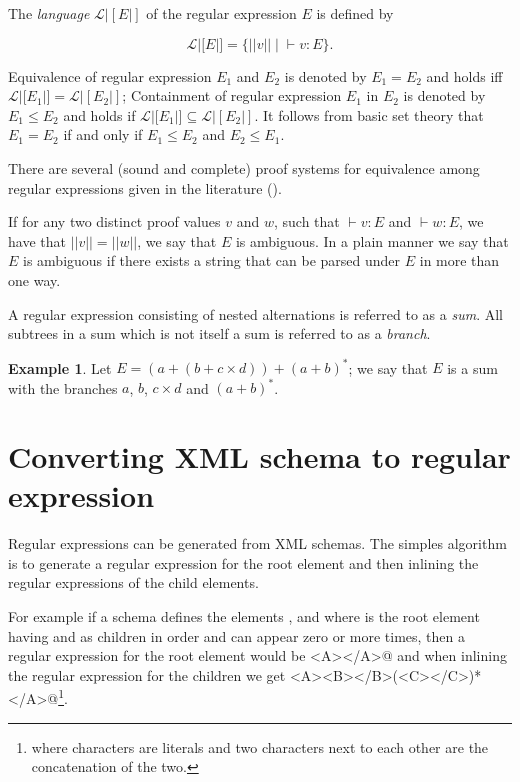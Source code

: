 \documentclass[a4paper, oneside]{memoir}
\theoremstyle{definition}
\newtheorem{example}{Example}
\begin{document}
The \emph{language} $\mathcal{L} |[E|]$ of the regular expression $E$ is defined by

\[
\mathcal{L}|[E|] = \lbrace ||v|| \; | \; \vdash v : E \rbrace.
\]

Equivalence of regular expression $E_1$ and $E_2$ is denoted by $E_1 = E_2$ and
holds iff $\mathcal{L}|[E_1|] = \mathcal{L}|[E_2|]$; Containment of regular
expression $E_1$ in $E_2$ is denoted by $E_1 \le E_2$ and holds if
$\mathcal{L}|[E_1|] \subseteq \mathcal{L}|[E_2|]$.  It follows from basic set
theory that $E_1 = E_2$ if and only if $E_1 \le E_2$ and $E_2 \le E_1$.

There are several (sound and complete) proof systems for equivalence among
regular expressions given in the literature (\cite{salomaa1966, kozen1994,
  grabmayer2005, heni2010}).

If for any two distinct proof values $v$ and $w$, such that $\vdash v : E$ and
$\vdash w : E$, we have that $||v|| = ||w||$, we say that $E$ is ambiguous. In a
plain manner we say that $E$ is ambiguous if there exists a string that can be
parsed under $E$ in more than one way.

A regular expression consisting of nested alternations is referred to as a \emph{sum}.
All subtrees in a sum which is not itself a sum is referred to as a \emph{branch}.

\begin{example}
Let $E = (a + (b + c \times d)) + (a + b)^{*}$; we say that $E$ is a sum with
the branches $a$, $b$, $c \times d$ and $(a + b)^{\ast}$.
\end{example}

\chapter{Converting XML schema to regular expression}
\label{chap:convert}

Regular expressions can be generated from XML schemas. The simples algorithm is
to generate a regular expression for the root element and then inlining the
regular expressions of the child elements.

For example if a schema defines the elements \verb@A@, \verb@B@ and \verb@C@
where \verb@A@ is the root element having \verb@B@ and \verb@C@ as children in
order and \verb@C@ can appear zero or more times, then a regular expression for
the root element would be \verb@<A></A>@ and when inlining the regular
expression for the children we get
\verb@<A><B></B>(<C></C>)*</A>@\footnote{where characters are literals and two
  characters next to each other are the concatenation of the two.}.
\end{document}
